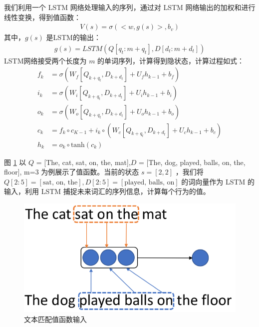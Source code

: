 \begin{enumerate}
		我们利用一个 LSTM 网络处理输入的序列，通过对 LSTM 网络输出的加权和进行线性变换，得到值函数：
	\begin{equation}\label{value_func}
	\begin{aligned}
		V(s) = \sigma(<w, g(s)>, b_v)
	\end{aligned}
	\end{equation}
		其中，$g(s)$ 是LSTM的输出：
	\begin{equation}\label{g(s)}
	\begin{aligned}
		g(s) = LSTM(Q[q_t: m+q_t], D[d_t: m+d_t])
	\end{aligned}
	\end{equation}
		LSTM网络接受两个长度为 $m$ 的单词序列，计算得到隐状态，计算过程如式：
	\begin{equation}\label{mdp_LSTM}
	\begin{aligned}
		f_k &= \sigma(W_f[Q_{k+q_{t}}, D_{k+d_{t}}] + U_fh_{k-1} + b_f) \\
i_k &= \sigma(W_i[Q_{k+q_{t}}, D_{k+d_{t}}] + U_ih_{k-1} + b_i) \\
o_k &= \sigma(W_o[Q_{k+q_{t}}, D_{k+d_{t}}] + U_oh_{k-1} + b_o) \\
c_k &= f_k \circ c_{K-1} + i_k \circ (W_c[Q_{k+q_{t}}, D_{k+d_{t}}] + U_ch_{k-1}+b_c) \\
h_k &= o_k \circ \text{tanh}(c_k) 
	\end{aligned}
	\end{equation}
		
\end{enumerate}

图 \ref{fig:value_function_input} 以 $Q$ = [The, cat, sat, on, the, mat],$D$ = [The, dog, played, balls, on, the, floor], m=3 为例展示了值函数。当前的状态 $s=[2, 2]$ ，我们将 $Q[2:5]=[\text{sat, on, the}], D[2:5]=[\text{played, balls, on}]$ 的词向量作为 LSTM 的输入，利用 LSTM 捕捉未来词汇的序列信息，计算每个行为的值。

\begin{figure}[!htbp]\centering
\vspace{1em}
  \includegraphics[width=0.6\linewidth]{figures/match_value_function}
  \caption{文本匹配值函数输入} 
  \label{fig:value_function_input}       %
\vspace{1em}
\end{figure}



